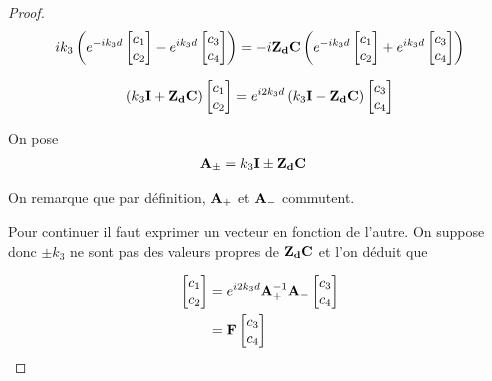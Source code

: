 \begin{proof}
    \begin{equation}
        ik_3\left( e^{-ik_3 d}
        \begin{bmatrix}
            c_1 \\
            c_2
        \end{bmatrix}
        -e^{ik_3 d}
        \begin{bmatrix}
            c_3 \\
            c_4
        \end{bmatrix}
        \right)
        =-i\mathbf{Z_d}\mathbf{C}
        \left(
            e^{-ik_3 d}
            \begin{bmatrix}
                c_1 \\
                c_2
            \end{bmatrix}
            +e^{ik_3 d}
            \begin{bmatrix}
                c_3 \\
                c_4
            \end{bmatrix}
        \right)
    \end{equation}

    \begin{equation}
        \left(k_3\mathbf{I} + \mathbf{Z_d}\mathbf{C}\right)
        \begin{bmatrix}
            c_1 \\
            c_2
        \end{bmatrix}
        = e^{i2k_3 d} \left(k_3\mathbf{I} - \mathbf{Z_d}\mathbf{C}\right)
        \begin{bmatrix}
            c_3 \\
            c_4
        \end{bmatrix}
    \end{equation}

    On pose
    \begin{align}
        \mathbf{A}_\pm &= k_3\mathbf{I} \pm \mathbf{Z_d}\mathbf{C}
    \end{align}

    On remarque que par définition, $\mathbf{A}_+$ et $\mathbf{A}_-$ commutent.

    Pour continuer il faut exprimer un vecteur en fonction de l'autre. On suppose donc $\pm k_3$ ne sont pas des valeurs propres de $\mathbf{Z_d}\mathbf{C}$ et l'on déduit que

    \begin{align}
        \begin{bmatrix}
            c_1 \\
            c_2
        \end{bmatrix}
        &= e^{i2 k_3 d} \mathbf{A}_+^{-1}\mathbf{A}_-
        \begin{bmatrix}
            c_3 \\
            c_4
        \end{bmatrix}
        \\
        & = \mathbf{F}
        \begin{bmatrix}
            c_3 \\
            c_4
        \end{bmatrix}
    \end{align}


\end{proof}
